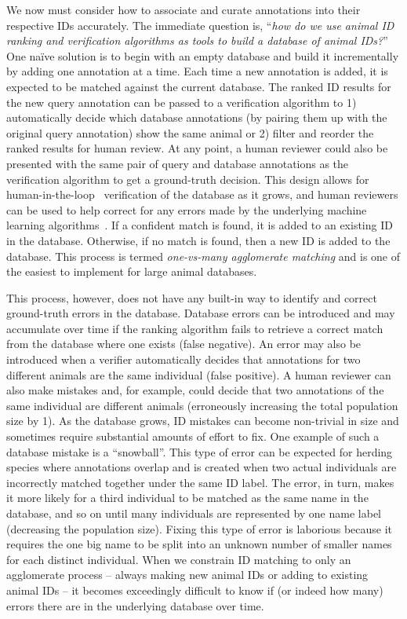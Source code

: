 We now must consider how to associate and curate annotations into their respective IDs accurately.  The immediate question is, ``\textit{how do we use animal ID ranking and verification algorithms as tools to build a database of animal IDs?}''  One na\"ive solution is to begin with an empty database and build it incrementally by adding one annotation at a time.  Each time a new annotation is added, it is expected to be matched against the current database.  The ranked ID results for the new query annotation can be passed to a verification algorithm to 1) automatically decide which database annotations (by pairing them up with the original query annotation) show the same animal or 2) filter and reorder the ranked results for human review.  At any point, a human reviewer could also be presented with the same pair of query and database annotations as the verification algorithm to get a ground-truth decision.  This design allows for human-in-the-loop~\cite{zanzotto_viewpoint_2019,xin_accelerating_2018,xin_helix_2018,kleinberg_human_2018} verification of the database as it grows, and human reviewers can be used to help correct for any errors made by the underlying machine learning algorithms~\cite{jiang_identifying_2020,gu_understanding_2019,schelter_taming_2020}.  If a confident match is found, it is added to an existing ID in the database.  Otherwise, if no match is found, then a new ID is added to the database.  This process is termed \textit{one-vs-many agglomerate matching} and is one of the easiest to implement for large animal databases\cite{berger-wolf_wildbook_2017}.

This process, however, does not have any built-in way to identify and correct ground-truth errors in the database.  Database errors can be introduced and may accumulate over time if the ranking algorithm fails to retrieve a correct match from the database where one exists (false negative).  An error may also be introduced when a verifier automatically decides that annotations for two different animals are the same individual (false positive).  A human reviewer can also make mistakes and, for example, could decide that two annotations of the same individual are different animals (erroneously increasing the total population size by 1).  As the database grows, ID mistakes can become non-trivial in size and sometimes require substantial amounts of effort to fix.  One example of such a database mistake is a ``snowball''.  This type of error can be expected for herding species where annotations overlap and is created when two actual individuals are incorrectly matched together under the same ID label.  The error, in turn, makes it more likely for a third individual to be matched as the same name in the database, and so on until many individuals are represented by one name label (decreasing the population size).  Fixing this type of error is laborious because it requires the one big name to be split into an unknown number of smaller names for each distinct individual.  When we constrain ID matching to only an agglomerate process -- always making new animal IDs or adding to existing animal IDs -- it becomes exceedingly difficult to know if (or indeed how many) errors there are in the underlying database over time.

